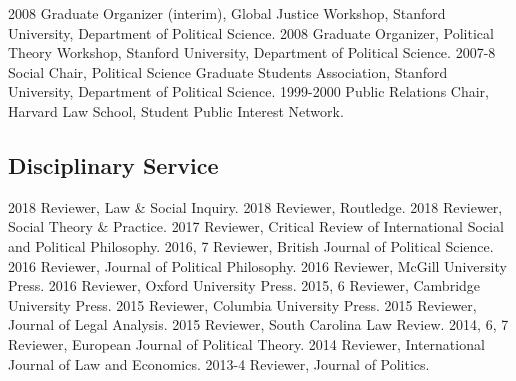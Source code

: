 \documentclass[letterpaper]{moderncv}
\begin{document}
\vspace{1mm}
\cvitem
{2008}
{Graduate Organizer (interim), Global Justice Workshop, Stanford University, Department of Political Science.}
\vspace{1mm}
\cvitem
{2008}
{Graduate Organizer, Political Theory Workshop, Stanford University, Department of Political Science.}
\vspace{1mm}
\cvitem
{2007-8}
{Social Chair, Political Science Graduate Students Association, Stanford University, Department of Political Science.}
\vspace{1mm}
\cvitem
{1999-2000}
{Public Relations Chair, Harvard Law School, Student Public Interest Network.}
\vspace{1mm}

\subsection{Disciplinary Service}
\cvitem
{2018}
{Reviewer, Law \& Social Inquiry.}
\vspace{1mm}
\cvitem
{2018}
{Reviewer, Routledge.}
\vspace{1mm}
\cvitem
{2018}
{Reviewer, Social Theory \& Practice.}
\vspace{1mm}
\cvitem
{2017}
{Reviewer, Critical Review of International Social and Political Philosophy.}
\vspace{1mm}
\cvitem
{2016, 7}
{Reviewer, British Journal of Political Science.}
\vspace{1mm}
\cvitem
{2016}
{Reviewer, Journal of Political Philosophy.}
\vspace{1mm}
\cvitem
{2016}
{Reviewer, McGill University Press.}
\vspace{1mm}
\cvitem
{2016}
{Reviewer, Oxford University Press.}
\vspace{1mm}
\cvitem
{2015, 6}
{Reviewer, Cambridge University Press.}
\vspace{1mm}
\cvitem
{2015}
{Reviewer, Columbia University Press.}
\vspace{1mm}
\cvitem
{2015}
{Reviewer, Journal of Legal Analysis.}
\vspace{1mm}
\cvitem
{2015}
{Reviewer, South Carolina Law Review.}
\vspace{1mm}
\cvitem
{2014, 6, 7}
{Reviewer, European Journal of Political Theory.}
\vspace{1mm}
\cvitem
{2014}
{Reviewer, International Journal of Law and Economics.}
\vspace{1mm}
\cvitem
{2013-4}
{Reviewer, Journal of Politics.}
\vspace{1mm}
\end{document}
